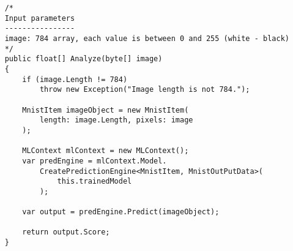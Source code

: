 \begin{verbatim}
    /*
    Input parameters
    ----------------
    image: 784 array, each value is between 0 and 255 (white - black)
    */
    public float[] Analyze(byte[] image)
    {
        if (image.Length != 784)
            throw new Exception("Image length is not 784.");

        MnistItem imageObject = new MnistItem(
            length: image.Length, pixels: image
        );

        MLContext mlContext = new MLContext();
        var predEngine = mlContext.Model.
            CreatePredictionEngine<MnistItem, MnistOutPutData>(
                this.trainedModel
            );

        var output = predEngine.Predict(imageObject);

        return output.Score;
    }
\end{verbatim}